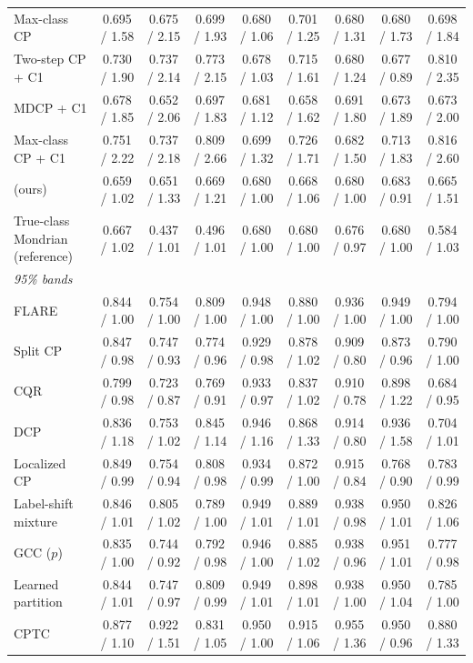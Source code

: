 \begin{table}[t]
{\begin{tabular}{lcccccccc}
Max-class CP & 0.695 / 1.58 & 0.675 / 2.15 & 0.699 / 1.93 & 0.680 / 1.06 & 0.701 / 1.25 & 0.680 / 1.31 & 0.680 / 1.73 & 0.698 / 1.84 \\
Two-step CP + C1 & 0.730 / 1.90 & 0.737 / 2.14 & 0.773 / 2.15 & 0.678 / 1.03 & 0.715 / 1.61 & 0.680 / 1.24 & 0.677 / 0.89 & 0.810 / 2.35 \\
MDCP + C1 & 0.678 / 1.85 & 0.652 / 2.06 & 0.697 / 1.83 & 0.681 / 1.12 & 0.658 / 1.62 & 0.691 / 1.80 & 0.673 / 1.89 & 0.673 / 2.00 \\
Max-class CP + C1 & 0.751 / 2.22 & 0.737 / 2.18 & 0.809 / 2.66 & 0.699 / 1.32 & 0.726 / 1.71 & 0.682 / 1.50 & 0.713 / 1.83 & 0.816 / 2.60 \\
\gamut{} (ours) & 0.659 / 1.02 & 0.651 / 1.33 & 0.669 / 1.21 & 0.680 / 1.00 & 0.668 / 1.06 & 0.680 / 1.00 & 0.683 / 0.91 & 0.665 / 1.51 \\
True-class Mondrian (reference) & 0.667 / 1.02 & 0.437 / 1.01 & 0.496 / 1.01 & 0.680 / 1.00 & 0.680 / 1.00 & 0.676 / 0.97 & 0.680 / 1.00 & 0.584 / 1.03 \\
\midrule
\multicolumn{9}{l}{\textit{95\% bands}} \\
\midrule
FLARE & 0.844 / 1.00 & 0.754 / 1.00 & 0.809 / 1.00 & 0.948 / 1.00 & 0.880 / 1.00 & 0.936 / 1.00 & 0.949 / 1.00 & 0.794 / 1.00 \\
Split CP & 0.847 / 0.98 & 0.747 / 0.93 & 0.774 / 0.96 & 0.929 / 0.98 & 0.878 / 1.02 & 0.909 / 0.80 & 0.873 / 0.96 & 0.790 / 1.00 \\
CQR & 0.799 / 0.98 & 0.723 / 0.87 & 0.769 / 0.91 & 0.933 / 0.97 & 0.837 / 1.02 & 0.910 / 0.78 & 0.898 / 1.22 & 0.684 / 0.95 \\
DCP & 0.836 / 1.18 & 0.753 / 1.02 & 0.845 / 1.14 & 0.946 / 1.16 & 0.868 / 1.33 & 0.914 / 0.80 & 0.936 / 1.58 & 0.704 / 1.01 \\
Localized CP & 0.849 / 0.99 & 0.754 / 0.94 & 0.808 / 0.98 & 0.934 / 0.99 & 0.872 / 1.00 & 0.915 / 0.84 & 0.768 / 0.90 & 0.783 / 0.99 \\
Label-shift mixture & 0.846 / 1.01 & 0.805 / 1.02 & 0.789 / 1.00 & 0.949 / 1.01 & 0.889 / 1.01 & 0.938 / 0.98 & 0.950 / 1.01 & 0.826 / 1.06 \\
GCC ($p$) & 0.835 / 1.00 & 0.744 / 0.92 & 0.792 / 0.98 & 0.946 / 1.00 & 0.885 / 1.02 & 0.938 / 0.96 & 0.951 / 1.01 & 0.777 / 0.98 \\
Learned partition & 0.844 / 1.01 & 0.747 / 0.97 & 0.809 / 0.99 & 0.949 / 1.01 & 0.898 / 1.01 & 0.938 / 1.00 & 0.950 / 1.04 & 0.785 / 1.00 \\
CPTC & 0.877 / 1.10 & 0.922 / 1.51 & 0.831 / 1.05 & 0.950 / 1.00 & 0.915 / 1.06 & 0.955 / 1.36 & 0.950 / 0.96 & 0.880 / 1.33 \\

\end{tabular}}
\end{table}
